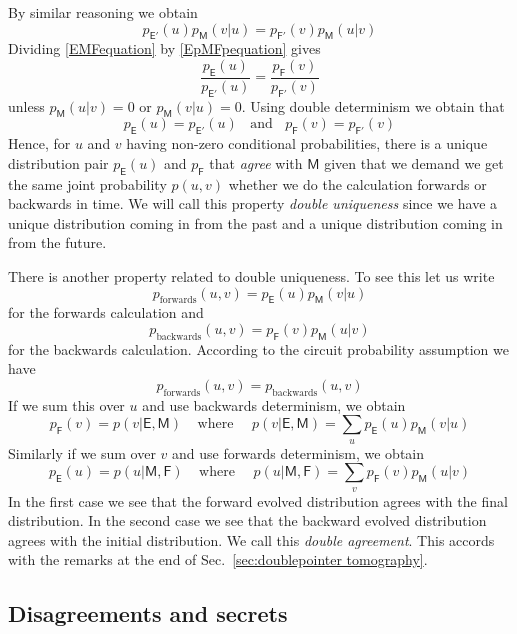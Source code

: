 \documentclass[10pt]{article}
\begin{document}
By similar reasoning we obtain
\begin{equation}\label{EpMFpequation}
p_\mathsf{E'}(u) p_\mathsf{M}(v|u) = p_\mathsf{F'}(v) p_\mathsf{M}(u|v)
\end{equation}
Dividing \eqref{EMFequation} by \eqref{EpMFpequation} gives
\[ \frac{p_\mathsf{E}(u)}{p_\mathsf{E'}(u)} = \frac{p_\mathsf{F}(v)}{p_\mathsf{F'}(v)}  \]
unless $p_\mathsf{M}(u|v)=0$ or $p_\mathsf{M}(v|u)=0$.
Using double determinism we obtain that
\begin{equation} \label{agreeuniqueness}
p_\mathsf{E}(u) = p_\mathsf{E'}(u) ~~~~\text{and}~~~~ p_\mathsf{F}(v) = p_\mathsf{F'}(v)
\end{equation}
Hence, for $u$ and $v$ having non-zero conditional probabilities, there is a unique distribution pair $p_\mathsf{E}(u)$ and $p_\mathsf{F}$ that \emph{agree} with $\mathsf{M}$ given that we demand we get the same joint probability $p(u,v)$ whether we do the calculation forwards or backwards in time.  We will call this property \emph{double uniqueness} since we have a unique distribution coming in from the past and a unique distribution coming in from the future.

There is another property related to double uniqueness.   To see this let us write
\[p_\text{forwards}(u,v) = p_\mathsf{E}(u) p_\mathsf{M}(v|u)\]
for the forwards calculation and
\[p_\text{backwards}(u,v) = p_\mathsf{F}(v) p_\mathsf{M}(u|v)\]
for the backwards calculation.  According to the circuit probability assumption we have
\begin{equation}
p_\text{forwards}(u,v) = p_\text{backwards}(u,v)
\end{equation}
If we sum this over $u$ and use backwards determinism, we obtain
\[ p_\mathsf{F}(v) = p(v|\mathsf{E,M}) ~~~~~\text{where}~~~~~~  p(v|\mathsf{E,M})= \sum_u p_\mathsf{E}(u) p_\mathsf{M}(v|u) \]
Similarly if we sum over $v$ and use forwards determinism, we obtain
\[ p_\mathsf{E}(u) = p(u|\mathsf{M, F}) ~~~~~\text{where}~~~~~~ p(u|\mathsf{M, F})= \sum_v p_\mathsf{F}(v) p_\mathsf{M}(u|v)   \]
In the first case we see that the forward evolved distribution agrees with the final distribution. In the second case we see that the backward evolved distribution agrees with the initial distribution.  We call this \emph{double agreement}.  This accords with the remarks at the end of Sec.\ \ref{sec:doublepointer tomography}.

\subsection{Disagreements and secrets}\label{sec:disagreementsandsecrets}
\end{document}
